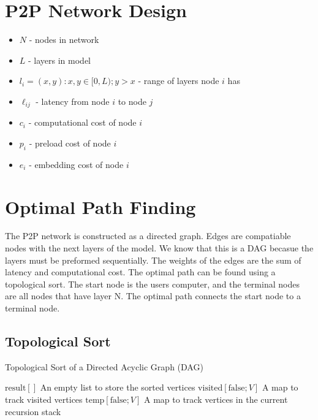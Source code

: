 \documentclass[a4paper,10pt]{article}
\begin{document}
\begin{flushleft}
	\section{P2P Network Design}
	\begin{itemize}
		\item $N$ - nodes in network
		\item $L$ - layers in model
		\item $l_i = (x,y) : x,y \in [0,L); y > x$ - range of layers node $i$ has
		\item $\ell _{ij}$ - latency from node $i$ to node $j$
		\item $c_i$ - computational cost of node $i$
		\item $p_i$ - preload cost of node $i$
		\item $e_i$ - embedding cost of node $i$
	\end{itemize}

	\section{Optimal Path Finding}
	The P2P network is constructed as a directed graph. Edges are compatiable nodes with the next layers of the model.
	We know that this is a DAG becasue the layers must be preformed sequentially. The weights of the edges are the sum of latency and computational cost.
	The optimal path can be found using a topological sort. The start node is the users computer, and the terminal nodes are all nodes that have layer N.
	The optimal path connects the start node to a terminal node.

	\subsection{Topological Sort}
	\begin{algorithm}
		\caption{Topological Sort of a Directed Acyclic Graph (DAG)}
		\begin{algorithmic}[1]

			\State $\text{result}[]$ \Comment An empty list to store the sorted vertices
			\State $\text{visited}[\text{false}; V]$ \Comment A map to track visited vertices
			\State $\text{temp}[\text{false}; V]$ \Comment A map to track vertices in the current recursion stack


\end{algorithmic}
\end{algorithm}
\end{flushleft}
\end{document}
